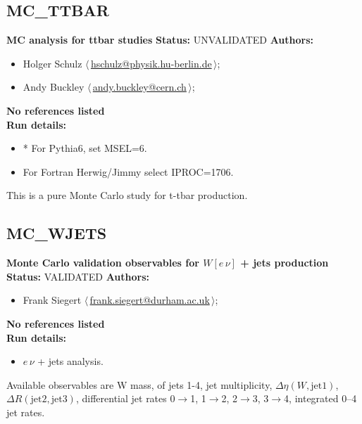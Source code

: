 \subsection{MC\_TTBAR}
\textbf{MC analysis for ttbar studies}\newline
\textbf{Status:} UNVALIDATED\newline
\textbf{Authors:}
\begin{itemize}
  \item Holger Schulz $\langle\,$\href{mailto:hschulz@physik.hu-berlin.de}{hschulz@physik.hu-berlin.de}$\,\rangle$;
  \item Andy Buckley $\langle\,$\href{mailto:andy.buckley@cern.ch}{andy.buckley@cern.ch}$\,\rangle$;
\end{itemize}
\textbf{No references listed}\\ 
\textbf{Run details:}
\begin{itemize}

  \item * For Pythia6, set MSEL=6.
  \item For Fortran Herwig/Jimmy select IPROC=1706.\end{itemize}

\noindent This is a pure Monte Carlo study for t-tbar production.

\clearpage


\clearpage

\subsection{MC\_WJETS}
\textbf{Monte Carlo validation observables for $W[e \, \nu]$ + jets production}\newline
\textbf{Status:} VALIDATED\newline
\textbf{Authors:}
\begin{itemize}
  \item Frank Siegert $\langle\,$\href{mailto:frank.siegert@durham.ac.uk}{frank.siegert@durham.ac.uk}$\,\rangle$;
\end{itemize}
\textbf{No references listed}\\ 
\textbf{Run details:}
\begin{itemize}

  \item $e \, \nu$ + jets analysis.\end{itemize}

\noindent Available observables are W mass, \pT of jets 1-4, jet multiplicity, $\Delta\eta(W, \text{jet1})$, $\Delta R(\text{jet2}, \text{jet3})$,  differential jet rates 0\ensuremath{\to}1, 1\ensuremath{\to}2, 2\ensuremath{\to}3, 3\ensuremath{\to}4, integrated 0--4 jet  rates.

